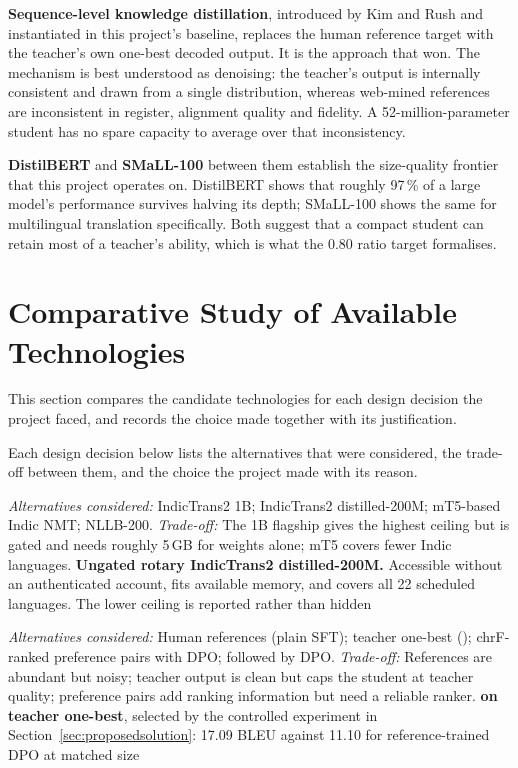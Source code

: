 \textbf{Sequence-level knowledge distillation}, introduced by Kim and Rush
\cite{ref:seqkd} and instantiated in this project's baseline, replaces the human
reference target with the teacher's own one-best decoded output. It is the
approach that won. The mechanism is best understood as denoising: the teacher's
output is internally consistent and drawn from a single distribution, whereas
web-mined references are inconsistent in register, alignment quality and
fidelity. A 52-million-parameter student has no spare capacity to average over
that inconsistency.

\textbf{DistilBERT} \cite{ref:distilbert} and \textbf{SMaLL-100}
\cite{ref:small100} between them establish the size-quality frontier that this
project operates on. DistilBERT shows that roughly 97\,\% of a large model's
performance survives halving its depth; SMaLL-100 shows the same for
multilingual translation specifically. Both suggest that a compact student can
retain most of a teacher's ability, which is what the 0.80 ratio target
formalises.

\section{Comparative Study of Available Technologies}
\label{sec:comparative}

This section compares the candidate technologies for each design decision the
project faced, and records the choice made together with its justification.

Each design decision below lists the alternatives that were considered, the
trade-off between them, and the choice the project made with its reason.

\emph{Alternatives considered:} IndicTrans2 1B; IndicTrans2 distilled-200M; mT5-based Indic NMT; NLLB-200. \emph{Trade-off:} The 1B flagship gives the highest ceiling but is gated and needs roughly 5\,GB for weights alone; mT5 covers fewer Indic languages. \textbf{Ungated rotary IndicTrans2 distilled-200M.} Accessible without an authenticated account, fits available memory, and covers all 22 scheduled languages. The lower ceiling is reported rather than hidden

\emph{Alternatives considered:} Human references (plain SFT); teacher one-best (\seqkd{}); chrF-ranked preference pairs with DPO; \seqkd{} followed by DPO. \emph{Trade-off:} References are abundant but noisy; teacher output is clean but caps the student at teacher quality; preference pairs add ranking information but need a reliable ranker. \textbf{\seqkd{} on teacher one-best}, selected by the controlled experiment in Section~\ref{sec:proposedsolution}: 17.09 BLEU against 11.10 for reference-trained DPO at matched size

